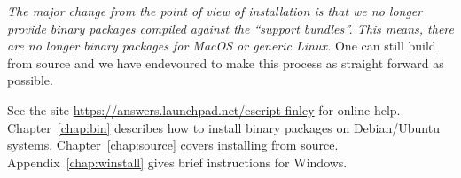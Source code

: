 \emph{The major change from the point of view of installation is that we no longer provide binary packages compiled
against the ``support bundles''.
This means, there are no longer binary packages for MacOS or generic Linux.
}
One can still build from source and we have endevoured to make this process as straight forward as possible.

See the site \url{https://answers.launchpad.net/escript-finley} for online help.
Chapter~\ref{chap:bin} describes how to install binary packages on Debian/Ubuntu systems.
Chapter~\ref{chap:source} covers installing from source.
Appendix~\ref{chap:winstall} gives brief instructions for Windows.


% 

